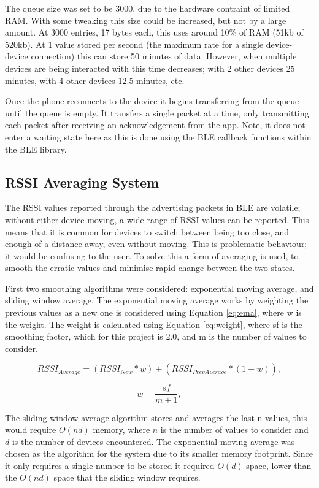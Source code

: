 \documentclass{l4proj}
\begin{document}
The queue size was set to be 3000, due to the hardware contraint of limited RAM. With some tweaking this size could be increased, but not by a large amount. At 3000 entries, 17 bytes each, this uses around 10\% of RAM (51kb of 520kb). At 1 value stored per second (the maximum rate for a single device-device connection) this can store 50 minutes of data. However, when multiple devices are being interacted with this time decreases; with 2 other devices 25 minutes, with 4 other devices 12.5 minutes, etc.

Once the phone reconnects to the device it begins transferring from the queue until the queue is empty. It transfers a single packet at a time, only transmitting each packet after receiving an acknowledgement from the app. Note, it does not enter a waiting state here as this is done using the BLE callback functions within the BLE library.

\subsection{RSSI Averaging System}

The RSSI values reported through the advertising packets in BLE are volatile; without either device moving, a wide range of RSSI values can be reported. This means that it is common for devices to switch between being too close, and enough of a distance away, even without moving. This is problematic behaviour; it would be confusing to the user. To solve this a form of averaging is used, to smooth the erratic values and minimise rapid change between the two states.

First two smoothing algorithms were considered: exponential moving average, and sliding window average. The exponential moving average works by weighting the previous values as a new one is considered using Equation \ref{eq:ema}, where w is the weight. The weight is calculated using Equation \ref{eq:weight}, where sf is the smoothing factor, which for this project is 2.0, and m is the number of values to consider.

\begin{equation}
    {RSSI}_{Average}={({RSSI}_{New} * w)} + {({RSSI}_{PrevAverage} * (1 - w))},
    \label{eq:ema}
\end{equation}

\begin{equation}
    w=\frac{sf}{m + 1},
    \label{eq:weight}
\end{equation}

The sliding window average algorithm stores and averages the last n values, this would require $O(nd)$ memory, where $n$ is the number of values to consider and $d$ is the number of devices encountered. The exponential moving average was chosen as the algorithm for the system due to its smaller memory footprint. Since it only requires a single number to be stored it required $O(d)$ space, lower than the $O(nd)$ space that the sliding window requires.
\end{document}

